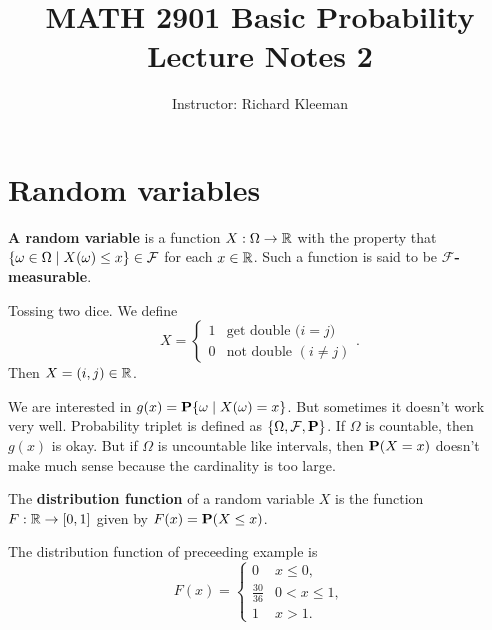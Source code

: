 


\title{MATH 2901 Basic Probability Lecture Notes 2}
\author{Instructor: Richard Kleeman}
\date{}
\maketitle


\section{Random variables}
\begin{definition}
\textbf{A random variable} is a function $X: \Omega \to \mathbb{R}$ with the property that $\{ \omega\in \Omega \;\vert\; X(\omega) \leq x\} \in \mathcal{F}$ for each $x \in \mathbb{R}$. Such a function is said to be $\mathbf{\mathcal{F}}$\textbf{-measurable}. 
\end{definition}

\begin{example}
Tossing two dice. We define 
\begin{equation*}
    X = \begin{cases} 1 & \text{get double ($i=j$)} \\ 0 & \text{not double $(i\neq j)$} \end{cases}.
\end{equation*}
Then $X = (i,j) \in \mathbb{R}$.
\end{example}

\begin{remark}
We are interested in $g(x) = \mathbf{P}\{ \omega \;\vert\; X(\omega) = x \}$. But sometimes it doesn't work very well. Probability triplet is defined as $\{ \Omega, \mathcal{F}, \mathbf{P} \}$. If $\Omega$ is countable, then $g(x)$ is okay. But if $\Omega$ is uncountable like intervals, then $\mathbf{P}(X=x)$ doesn't make much sense because the cardinality is too large.
\end{remark}

\begin{definition}
The \textbf{distribution function} of a random variable $X$ is the function $F: \mathbb{R} \to 
[0, 1]$ given by $F(x) = \mathbf{P}(X \leq x)$. 
\end{definition}

\begin{example}
The distribution function of preceeding example is 
\begin{equation*}
    F(x) = \begin{cases} 0 & x \leq 0, \\ \frac{30}{36} & 0 < x \leq 1, \\ 1 & x > 1. \end{cases}
\end{equation*}
\end{example}

